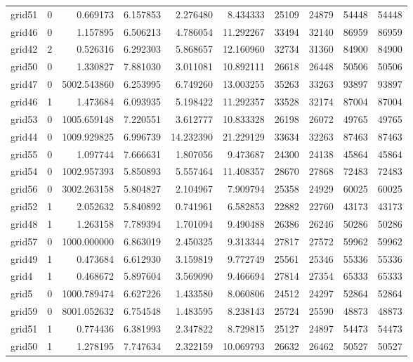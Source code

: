 \begin{longtable}{|l|r|r|r|r|r|r|r|r|r|}
grid51 & 0 & 0.669173 & 6.157853 & 2.276480 & 8.434333 & 25109 & 24879 & 54448 & 54448 \\
grid46 & 0 & 1.157895 & 6.506213 & 4.786054 & 11.292267 & 33494 & 32140 & 86959 & 86959 \\
grid42 & 2 & 0.526316 & 6.292303 & 5.868657 & 12.160960 & 32734 & 31360 & 84900 & 84900 \\
grid50 & 0 & 1.330827 & 7.881030 & 3.011081 & 10.892111 & 26618 & 26448 & 50506 & 50506 \\
grid47 & 0 & 5002.543860 & 6.253995 & 6.749260 & 13.003255 & 35263 & 33263 & 93897 & 93897 \\
grid46 & 1 & 1.473684 & 6.093935 & 5.198422 & 11.292357 & 33528 & 32174 & 87004 & 87004 \\
grid53 & 0 & 1005.659148 & 7.220551 & 3.612777 & 10.833328 & 26198 & 26072 & 49765 & 49765 \\
grid44 & 0 & 1009.929825 & 6.996739 & 14.232390 & 21.229129 & 33634 & 32263 & 87463 & 87463 \\
grid55 & 0 & 1.097744 & 7.666631 & 1.807056 & 9.473687 & 24300 & 24138 & 45864 & 45864 \\
grid54 & 0 & 1002.957393 & 5.850893 & 5.557464 & 11.408357 & 28670 & 27868 & 72483 & 72483 \\
grid56 & 0 & 3002.263158 & 5.804827 & 2.104967 & 7.909794 & 25358 & 24929 & 60025 & 60025 \\
grid52 & 1 & 2.052632 & 5.840892 & 0.741961 & 6.582853 & 22882 & 22760 & 43173 & 43173 \\
grid48 & 1 & 1.263158 & 7.789394 & 1.701094 & 9.490488 & 26386 & 26246 & 50286 & 50286 \\
grid57 & 0 & 1000.000000 & 6.863019 & 2.450325 & 9.313344 & 27817 & 27572 & 59962 & 59962 \\
grid49 & 1 & 0.473684 & 6.612930 & 3.159819 & 9.772749 & 25561 & 25346 & 55336 & 55336 \\
grid4 & 1 & 0.468672 & 5.897604 & 3.569090 & 9.466694 & 27814 & 27354 & 65333 & 65333 \\
grid5 & 0 & 1000.789474 & 6.627226 & 1.433580 & 8.060806 & 24512 & 24297 & 52864 & 52864 \\
grid59 & 0 & 8001.052632 & 6.754548 & 1.483595 & 8.238143 & 25724 & 25590 & 48873 & 48873 \\
grid51 & 1 & 0.774436 & 6.381993 & 2.347822 & 8.729815 & 25127 & 24897 & 54473 & 54473 \\
grid50 & 1 & 1.278195 & 7.747634 & 2.322159 & 10.069793 & 26632 & 26462 & 50527 & 50527 \\

\end{longtable}
